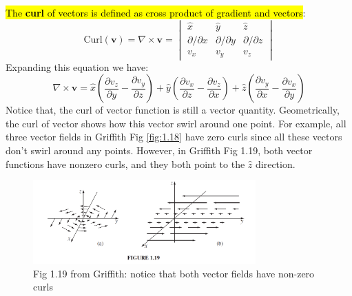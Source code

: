 \documentclass[12pt,a4paper,twoside]{article}
\begin{document}
	\noindent \hl{The \textbf{curl} of vectors is defined as cross product of gradient and vectors}:
	\begin{equation}
		\mathrm{Curl(\textbf{v})} = \nabla\times \textbf{v} = \begin{vmatrix} \hat{x}& \hat{y} &\hat{z} \\ \partial/\partial x & \partial/\partial y  &\partial/\partial z \\v_x  &v_y  &v_z \end{vmatrix}
	\end{equation}
	Expanding this equation we have:
	\[\nabla\times \textbf{v}=\hat{x}\left(\frac{\partial v_z}{\partial y}-\frac{\partial v_y}{\partial z}\right) +\hat{y}\left(\frac{\partial v_x}{\partial z}-\frac{\partial v_z}{\partial x}\right)+\hat{z}\left(\frac{\partial v_y}{\partial x}-\frac{\partial v_x}{\partial y}\right)\]
	Notice that, the curl of vector function is still a vector quantity. Geometrically, the curl of vector shows how this vector swirl around one point. For example, all three vector fields in Griffith Fig \ref{fig:1.18} have zero curls since all these vectors don't swirl around any points. However, in Griffith Fig 1.19, both vector functions have nonzero curls, and they both point to the \(\hat{z}\) direction.
	\begin{figure}[ht!]
		\centering
		\includegraphics[height=3.2cm]{curl.png}
		\caption{Fig 1.19 from Griffith: notice that both vector fields have non-zero curls }
		\label{fig:1.19}
	\end{figure}
\end{document}
